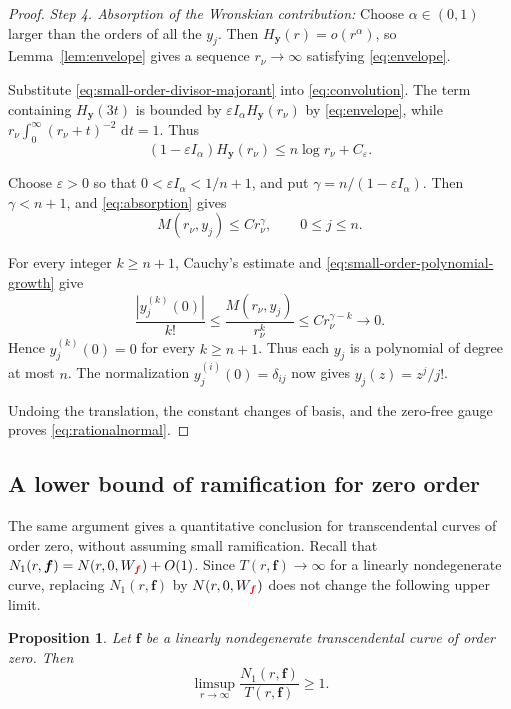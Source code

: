 \documentclass[12pt,letterpaper,reqno]{amsart}
\newtheorem{prop}[thm]{Proposition}
\theoremstyle{definition}
\numberwithin{equation}{section}
\newcommand{\dd}{\,\mathrm d}
\newcommand{\fv}{\bm f}
\newcommand{\yv}{\bm y}
\newcommand{\revision}[1]{\textcolor{red}{#1}}
\begin{document}
\begin{proof}
\medskip\noindent
\emph{{Step 4. Absorption of the Wronskian contribution:}}
Choose \(\alpha\in(0,1)\) larger than the orders of all the \(y_j\).
Then \(H_{\yv}(r)=o(r^\alpha)\), so
Lemma~\ref{lem:envelope} gives a sequence \(r_\nu\to\infty\)
satisfying \eqref{eq:envelope}.

Substitute \eqref{eq:small-order-divisor-majorant} into
\eqref{eq:convolution}. The term containing \(H_{\yv}(3t)\) is
bounded by \(\varepsilon I_\alpha H_{\yv}(r_\nu)\) by
\eqref{eq:envelope}, while
\(r_\nu\int_0^\infty(r_\nu+t)^{-2}\,\dd t=1\).
Thus
\begin{equation}\label{eq:absorption}
 (1-\varepsilon I_\alpha)H_{\yv}(r_\nu)
 \leq
 n\log r_\nu+C_\varepsilon.
\end{equation}

Choose \(\varepsilon>0\) so that
\(0<\varepsilon I_\alpha<1/{n+1}\), and put
\(\gamma=n/(1-\varepsilon I_\alpha)\). Then \(\gamma<{n+1}\), and
\eqref{eq:absorption} gives
\begin{equation}\label{eq:small-order-polynomial-growth}
 M(r_\nu,y_j)
 \leq
 C r_\nu^\gamma,
 \qquad
 0\leq j\leq n.
\end{equation}

For every integer \(k\geq n+1\), Cauchy's estimate and
\eqref{eq:small-order-polynomial-growth} give
\[
 \frac{|y_j^{(k)}(0)|}{k!}
 \leq
 \frac{M(r_\nu,y_j)}{r_\nu^k}
 \leq
 C r_\nu^{\gamma-k}
 \longrightarrow0.
\]
Hence \(y_j^{(k)}(0)=0\) for every \(k\geq n+1\). Thus each \(y_j\) is
a polynomial of degree at most \(n\). The normalization
\(y_j^{(i)}(0)=\delta_{ij}\) now gives
\(y_j(z)=z^j/j!\).

Undoing the translation, the constant changes of basis, and the
zero-free gauge proves \eqref{eq:rationalnormal}.
\end{proof}


\subsection{A lower bound of ramification for zero order}

The same argument gives a quantitative conclusion for transcendental
curves of order zero, without assuming small ramification. Recall that
\(N_1(r,\fv)=N(r,0,W_{\revision{\fv}})+O(1)\). Since
\(T(r,\fv)\to\infty\) for a linearly nondegenerate curve, replacing
\(N_1(r,\fv)\) by \(N(r,0,W_{\revision{\fv}})\) does not change the following
upper limit.


\begin{prop}\label{prop:zero-order-ramification}
Let \(\fv\) be a linearly nondegenerate transcendental curve of order
zero. Then
\begin{equation}\label{eq:zero-order-ramification}
 \limsup_{r\to\infty}
 \frac{N_1(r,\fv)}{T(r,\fv)}
 \geq1.
\end{equation}
\end{prop}
\end{document}
